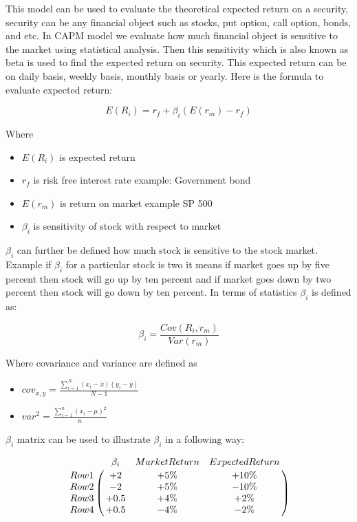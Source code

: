 This model can be used to evaluate the theoretical expected return on a security, security can be any financial object such as stocks, put option, call option, bonds, and etc. 
In CAPM model we evaluate how much financial object is sensitive to the market using statistical analysis. Then this sensitivity which is also known as beta is used
to find the expected return on security. This expected return can be on daily basis, weekly basis, monthly basis or yearly. Here is the formula to evaluate expected return:


$$E(R_{i}) = r_{f} + \beta_{i}(E(r_{m}) - r_{f})$$

\indent
Where
\indent 

 
\begin{itemize} 
\item $E(R_{i})$ is expected return 
\item $r_{f}$ is risk free interest rate example: Government bond
\item $E(r_{m})$ is return on market example SP 500
\item $\beta_{i}$ is sensitivity of stock with respect to market  
\end{itemize}


$\beta_{i}$ can further be defined how much stock is sensitive to the stock market. Example if $\beta_{i}$  for a particular stock is two it means if market goes up by five percent then stock will go up by ten percent and if market goes down by two percent then stock will go down by ten percent. In terms of statistics $\beta_{i}$  is defined as:

$$\beta_{i}  = \frac{Cov(R_{i},r_{m})}{Var(r_{m})}$$

\indent
Where covariance and variance are defined as
\indent

\begin{itemize} 
\item $cov_{x,y}=\frac{\sum_{i=1}^{N}(x_{i}-\bar{x})(y_{i}-\bar{y})}{N-1}$

\item $var^2 = \frac{\displaystyle\sum_{i=1}^{n}(x_i - \mu)^2} {n}$
\end{itemize}

\indent 
$\beta_{i}$ matrix can be used to illustrate $\beta_{i}$ in a following way:

$$\bordermatrix{\text{}&\beta_{i} &Market Return  &Expected Return\cr
                Row 1& +2   &  +5 \%  &  +10 \%\cr
                Row 2& -2   &  +5 \%  &  -10 \%\cr
                Row 3& +0.5 &  +4 \%  &  +2  \%\cr
                Row 4& +0.5 &  -4 \%  &  -2  \%}$$

